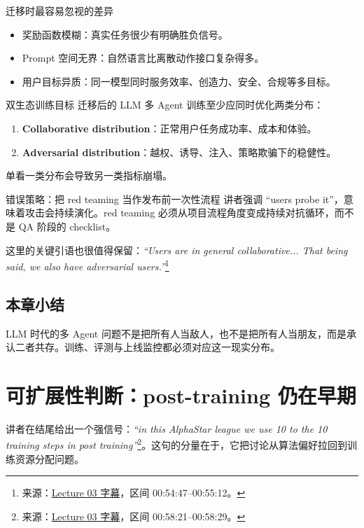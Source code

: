 \documentclass[a4paper]{article}
\begin{document}
\begin{knowledgebox}{迁移时最容易忽视的差异}
\begin{itemize}
    \item 奖励函数模糊：真实任务很少有明确胜负信号。
    \item Prompt 空间无界：自然语言比离散动作接口复杂得多。
    \item 用户目标异质：同一模型同时服务效率、创造力、安全、合规等多目标。
\end{itemize}
\end{knowledgebox}

\begin{importantbox}{双生态训练目标}
迁移后的 LLM 多 Agent 训练至少应同时优化两类分布：
\begin{enumerate}
    \item \textbf{Collaborative distribution}：正常用户任务成功率、成本和体验。
    \item \textbf{Adversarial distribution}：越权、诱导、注入、策略欺骗下的稳健性。
\end{enumerate}
单看一类分布会导致另一类指标崩塌。
\end{importantbox}

\begin{warningbox}{错误策略：把 red teaming 当作发布前一次性流程}
讲者强调 ``users probe it''，意味着攻击会持续演化。red teaming 必须从项目流程角度变成持续对抗循环，而不是 QA 阶段的 checklist。
\end{warningbox}

这里的关键引语也很值得保留：\textit{``Users are in general collaborative... That being said, we also have adversarial users.''}\footnote{来源：\href{https://www.youtube.com/watch?v=ntjOxjZMaac}{Lecture 03 字幕}，区间 00:54:47--00:55:12。}

\subsection{本章小结}
LLM 时代的多 Agent 问题不是把所有人当敌人，也不是把所有人当朋友，而是承认二者共存。训练、评测与上线监控都必须对应这一现实分布。

\section{可扩展性判断：post-training 仍在早期}

讲者在结尾给出一个强信号：\textit{``in this AlphaStar league we use 10 to the 10 training steps in post training''}\footnote{来源：\href{https://www.youtube.com/watch?v=ntjOxjZMaac}{Lecture 03 字幕}，区间 00:58:21--00:58:29。}。这句的分量在于，它把讨论从算法偏好拉回到训练资源分配问题。
\end{document}
